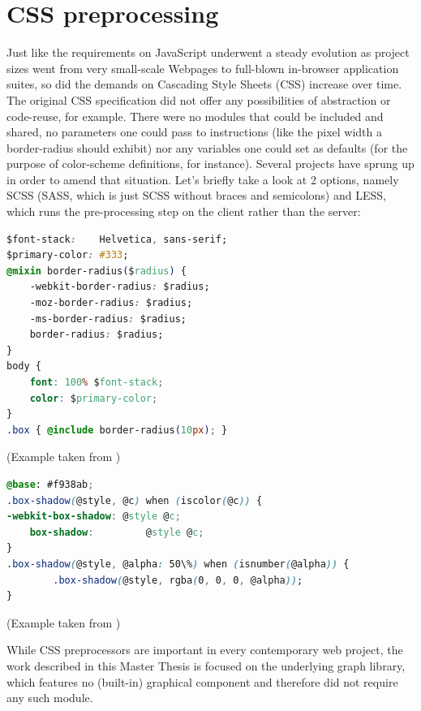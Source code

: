 \section{CSS preprocessing}
\label{sect:css_preproc}

	Just like the requirements on JavaScript underwent a steady evolution as project sizes went from very small-scale Webpages to full-blown in-browser application suites, so did the demands on Cascading Style Sheets (CSS) increase over time. The original CSS specification did not offer any possibilities of abstraction or code-reuse, for example. There were no modules that could be included and shared, no parameters one could pass to instructions (like the pixel width a border-radius should exhibit) nor any variables one could set as defaults (for the purpose of color-scheme definitions, for instance). Several projects have sprung up in order to amend that situation. Let's briefly take a look at 2 options, namely SCSS (SASS, which is just SCSS without braces and semicolons) and LESS, which runs the pre-processing step on the client rather than the server:
	
	\begin{lstlisting}[caption={SCSS example demonstrating the use of variables and mixings}, label={fig:scss_preproc}, language=CSS]
$font-stack:    Helvetica, sans-serif;
$primary-color: #333;
@mixin border-radius($radius) {
	-webkit-border-radius: $radius;
	-moz-border-radius: $radius;
	-ms-border-radius: $radius;
	border-radius: $radius;
}
body {
	font: 100% $font-stack;
	color: $primary-color;
}	
.box { @include border-radius(10px); }
	\end{lstlisting}
	\small
	(Example taken from \citep{SassBasics})
	
	
	\begin{lstlisting}[caption={LESS example demonstrating the use of variables and default parameters}, label={fig:less_preproc}, language=CSS]
@base: #f938ab;	
.box-shadow(@style, @c) when (iscolor(@c)) {
-webkit-box-shadow: @style @c;
	box-shadow:         @style @c;
}
.box-shadow(@style, @alpha: 50\%) when (isnumber(@alpha)) {
		.box-shadow(@style, rgba(0, 0, 0, @alpha));
}
	\end{lstlisting}
	\small
	(Example taken from \citep{LessCSS})
	
	While CSS preprocessors are important in every contemporary web project, the work described in this Master Thesis is focused on the underlying graph library, which features no (built-in) graphical component and therefore did not require any such module.
	
